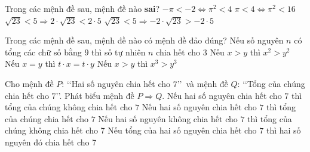\begin{ex}%
	Trong các mệnh đề sau, mệnh đề nào {\bf  sai}?
	 \choice
		{\True $-\pi <-2 \Leftrightarrow  \pi^2 < 4$}
		{$\pi < 4 \Leftrightarrow \pi^2 <  16$}
		{$\sqrt{23} < 5 \Rightarrow 2\cdot \sqrt{23}  < 2\cdot 5$}
		{$\sqrt{23} < 5  \Rightarrow-2\cdot \sqrt{23} >-2\cdot 5$}
\end{ex}

\begin{ex}%
	Trong các mệnh đề sau, mệnh  đề nào có mệnh đề đảo đúng?
	\choice 
		 {Nếu số nguyên $n$ có tổng các chữ số bằng $9$ thì số tự nhiên $n$ chia hết cho $3$}
		{Nếu $x>y$ thì  $x^{2}>y^{2}$}
		 {Nếu $x=y$ thì $t\cdot x=t\cdot y$}
		{\True Nếu $x>y$ thì $x^{3}>y^{3}$} 
\end{ex}

\begin{ex}%
	Cho mệnh đề $P$: \lq\lq Hai số nguyên chia hết cho $7$\rq\rq\, và mệnh đề $Q$: \lq\lq Tổng của chúng chia hết cho $7$\rq\rq . Phát  biểu mệnh đề $P \Rightarrow Q$.
	\choice 
		{Nếu hai số nguyên chia hết cho $7$ thì tổng của chúng không  chia hết cho $7$}
		{\True Nếu hai số  nguyên chia hết cho $7$ thì tổng của chúng chia hết cho $7$}
		{Nếu hai số nguyên không chia hết cho  $7$ thì tổng của chúng không chia hết cho 7}
		{Nếu tổng của hai số nguyên chia hết cho $7$ thì hai số nguyên  đó chia hết cho 7}
\end{ex}

